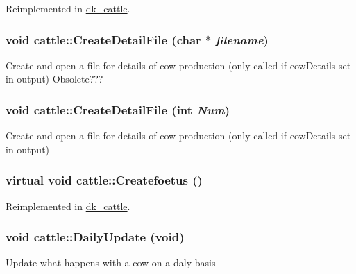 Reimplemented in \hyperlink{classdk__cattle_af4ba40d77f7e6e452b022554793a5fd9}{dk\_\-cattle}.\hypertarget{classcattle_a046831ac9ac76d46a2fc281301d07469}{
\subsubsection[{CreateDetailFile}]{\setlength{\rightskip}{0pt plus 5cm}void cattle::CreateDetailFile (char $\ast$ {\em filename})}}
\label{classcattle_a046831ac9ac76d46a2fc281301d07469}
Create and open a file for details of cow production (only called if cowDetails set in output) Obsolete??? \hypertarget{classcattle_a3d331307509c0f26ab8ae6b2f890f889}{
\subsubsection[{CreateDetailFile}]{\setlength{\rightskip}{0pt plus 5cm}void cattle::CreateDetailFile (int {\em Num})}}
\label{classcattle_a3d331307509c0f26ab8ae6b2f890f889}
Create and open a file for details of cow production (only called if cowDetails set in output) \hypertarget{classcattle_a42b73eb64c061427ced81f8524ea76a9}{
\subsubsection[{Createfoetus}]{\setlength{\rightskip}{0pt plus 5cm}virtual void cattle::Createfoetus ()}}
\label{classcattle_a42b73eb64c061427ced81f8524ea76a9}


Reimplemented in \hyperlink{classdk__cattle_ab5538cedcf88ec9337c48fe35eaf75aa}{dk\_\-cattle}.\hypertarget{classcattle_a418e7ccadab4a1b2b71d5687c4f22373}{
\subsubsection[{DailyUpdate}]{\setlength{\rightskip}{0pt plus 5cm}void cattle::DailyUpdate (void)}}
\label{classcattle_a418e7ccadab4a1b2b71d5687c4f22373}
Update what happens with a cow on a daly basis 


